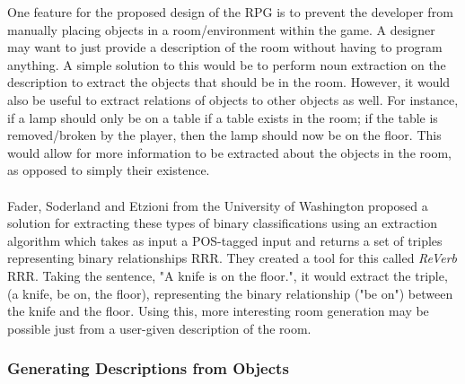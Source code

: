 \documentclass[11pt]{article}
\begin{document}
One feature for the proposed design of the RPG is to prevent the developer from manually placing objects in a room/environment within the game. A designer may want to just provide a description of the room without having to program anything. A simple solution to this would be to perform noun extraction on the description to extract the objects that should be in the room. However, it would also be useful to extract relations of objects to other objects as well. For instance, if a lamp should only be on a table if a table exists in the room; if the table is removed/broken by the player, then the lamp should now be on the floor. This would allow for more information to be extracted about the objects in the room, as opposed to simply their existence.
\\
\\
Fader, Soderland and Etzioni from the University of Washington proposed a solution for extracting these types of binary classifications using an extraction algorithm which takes as input a POS-tagged input and returns a set of triples representing binary relationships RRR. They created a tool for this called \textit{ReVerb} RRR. Taking the sentence, "A knife is on the floor.", it would extract the triple, (a knife, be on, the floor), representing the binary relationship ("be on") between the knife and the floor. Using this, more interesting room generation may be possible just from a user-given description of the room.

\subsubsection{Generating Descriptions from Objects}
\end{document}
